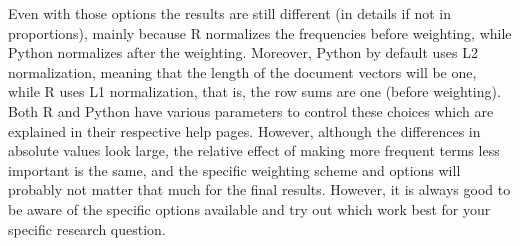 Even with those options the results are still different (in details if not in proportions),
mainly because R normalizes the frequencies before weighting, while Python normalizes after the weighting.
Moreover, Python by default uses L2 normalization, meaning that the length of the document vectors will be one,
while R uses L1 normalization, that is, the row sums are one (before weighting).
Both R and Python have various parameters to control these choices which are explained in their respective help pages.
However, although the differences in absolute values look large, the relative effect of making more frequent terms less important is the same,
and the specific weighting scheme and options will probably not matter that much for the final results.
However, it is always good to be aware of the specific options available and try out which work best for your specific research question.




